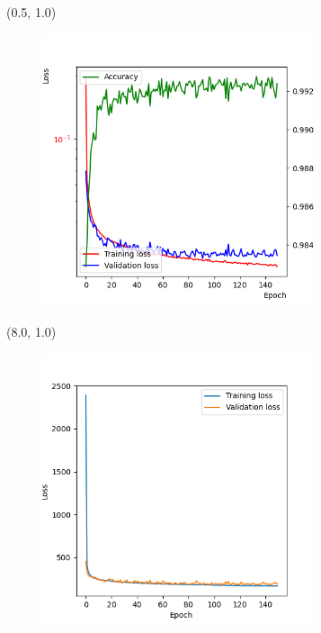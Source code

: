 \documentclass[12pt, xcolor={dvipsnames}, aspectratio = 169]{beamer}
\begin{document}
\begin{frame}

\begin{textblock}{8.0}(0.5, 1.0)
    \begin{figure}
        \centering
        \includegraphics[width=8.0cm]{../imgs/cls-loss.png}
    \end{figure}
\end{textblock}

\begin{textblock}{8.0}(8.0, 1.0)
    \begin{figure}
        \centering
        \includegraphics[width=8.0cm]{../imgs/reg-loss.png}
    \end{figure}
\end{textblock}

\end{frame}
\end{document}
